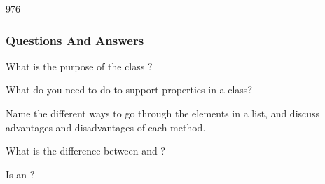 \begin{slide}[fragile]{976}
  \frametitle{Questions And Answers}\label{parentChildQuestions}
  \begin{questionize}
  \item What is the purpose of the class ?
  \item What do you need to do to support properties in a class?
  \item Name the different ways to go through the elements in a list, and discuss
    advantages and disadvantages of each method.
  \item What is the difference between  and ?
  \item Is  an ?
 \end{questionize}
\end{slide}
